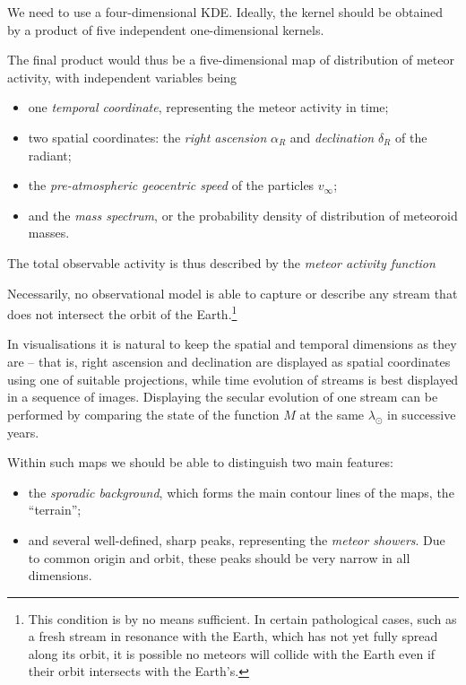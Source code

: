     We need to use a four-dimensional KDE. Ideally, the kernel should be obtained by a product of five
    independent one-dimensional kernels.

    The final product would thus be a five-dimensional map of distribution of meteor activity, with independent variables being
    \begin{itemize}
        \item one \emph{temporal coordinate}, representing the meteor activity in time;
        \item two spatial coordinates: the \emph{right ascension} $\alpha_R$ and \emph{declination} $\delta_R$ of the radiant;
        \item the \emph{pre-atmospheric geocentric speed} of the particles $v_\infty$;
        \item and the \emph{mass spectrum}, or the probability density of distribution of meteoroid masses.
    \end{itemize}

    The total observable activity is thus described by the \emph{meteor activity function}

    Necessarily, no observational model is able to capture or describe any stream that does not intersect the orbit of the
    Earth.\footnote{This condition is by no means sufficient. In certain pathological cases, such as a fresh stream in resonance
    with the Earth, which has not yet fully spread along its orbit, it is possible no meteors will collide with the Earth even
    if their orbit intersects with the Earth's.}

    In visualisations it is natural to keep the spatial and temporal dimensions as they are -- that is,
    right ascension and declination are displayed as spatial coordinates using one of suitable projections,
    while time evolution of streams is best displayed in a sequence of images.
    Displaying the secular evolution of one stream can be performed by comparing the state of the function $M$ at
    the same $\lambda_\odot$ in successive years.

    Within such maps we should be able to distinguish two main features:
    \begin{itemize}
        \item the \emph{sporadic background}, which forms the main contour lines of the maps, the ``terrain'';
        \item and several well-defined, sharp peaks, representing the \emph{meteor showers}. Due to common origin and orbit,
            these peaks should be very narrow in all dimensions.
    \end{itemize}

